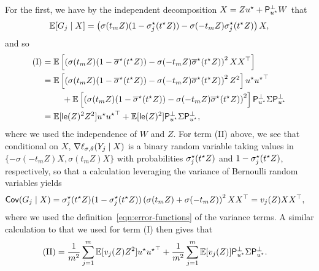 For the first, we have by the independent decomposition
$X = Z u^\star + \mathsf{P}_{u^\star}^\perp W$ that
\begin{equation*}
	\mathbb{E}[G_j \mid X]
	= 
	\left(\sigma(t_m Z)
	(1 - \sigma_j^\star(t^\star Z))
	- \sigma(- t_m Z) \sigma_j^\star(t^\star Z)\right)
	X,
\end{equation*}
and so
\begin{align*}
	\mathrm{(I)} & =
	\mathbb{E}\left[\left(\sigma(t_m Z) (1 - \overline{\sigma}^\star(t^\star Z))
	- \sigma(-t_m Z) \overline{\sigma}^\star(t^\star Z)\right)^2 XX^\top \right] \\
	& =
	\mathbb{E}\left[\left(\sigma(t_m Z) (1 - \overline{\sigma}^\star(t^\star Z))
	- \sigma(-t_m Z) \overline{\sigma}^\star(t^\star Z)\right)^2 Z^2 \right]
	u^\star {u^\star}^\top
	\\ & \qquad ~ + 
	\mathbb{E}\left[\left(\sigma(t_m Z) (1 - \overline{\sigma}^\star(t^\star Z))
	- \sigma(-t_m Z) \overline{\sigma}^\star(t^\star Z)\right)^2\right]
	\mathsf{P}_{u^\star}^\perp \Sigma \mathsf{P}_{u^\star}^\perp \\
	& = \mathbb{E}[\mathsf{le}(Z)^2 Z^2] u^\star {u^\star}^\top
	+ \mathbb{E}[\mathsf{le}(Z)^2]   \mathsf{P}_{u^\star}^\perp \Sigma \mathsf{P}_{u^\star}^\perp,
\end{align*}
where we used the independence of $W$ and $Z$.
For term (II) above, we see that conditional on $X$,
$\nabla \ell_{\sigma,\theta}(Y_j \mid X)$ is a binary
random variable taking values in
$\{-\sigma(-t_m Z) X, \sigma(t_m Z) X\}$ with probabilities
$\sigma_j^\star(t^\star Z)$ and
$1 - \sigma_j^\star(t^\star Z)$, respectively, so that
a calculation leveraging the variance of Bernoulli random variables
yields
\begin{align*}
	\mathsf{Cov}(G_j \mid X)
	& = \sigma_j^\star(t^\star Z) (1 - \sigma_j^\star(t^\star Z))
	\left(\sigma(t_m Z) + \sigma(-t_m Z)\right)^2 XX^\top
	= v_j(Z) XX^\top,
\end{align*}
where we used the definition~\eqref{eqn:error-functions} of the
variance terms.
A similar calculation to that we used for term (I) then gives that
\begin{align*}
	\mathrm{(II)} & = \frac{1}{m^2}
	\sum_{j = 1}^m \mathbb{E}[v_j(Z) Z^2] u^\star {u^\star}^\top
	+ \frac{1}{m^2}
	\sum_{j = 1}^m \mathbb{E}[v_j(Z)] \mathsf{P}_{u^\star}^\perp \Sigma \mathsf{P}_{u^\star}^\perp.
\end{align*}
